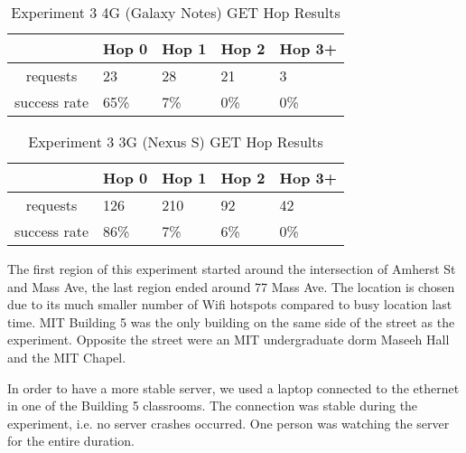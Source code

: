 
\begin{table}[htb]
\begin{scriptsize} 
\caption{Experiment 3 4G (Galaxy Notes) GET Hop Results} 
\label{table:exp-3-4g-hop-results}
 \begin{center}
 \begin{tabular}{| c | p{1.5cm} | p{1.5cm} | p{1.5cm} | p{1.4cm} |}
  \hline
   & Hop 0 & Hop 1 & Hop 2 & Hop 3+ \\
  \hline
  requests & 23 & 28 & 21 & 3\\
  \hline
  success rate & 65\% & 7\% & 0\% & 0\% \\
  \hline
  \end{tabular}
  \end{center}
\end{scriptsize}
\end{table}

\begin{table}[htb]
\begin{scriptsize} 
\caption{Experiment 3 3G (Nexus S) GET Hop Results} 
\label{table:exp-3-3g-hop-results}
 \begin{center}
 \begin{tabular}{| c | p{1.5cm} | p{1.5cm} | p{1.5cm} | p{1.4cm} |}
  \hline
   & Hop 0 & Hop 1 & Hop 2 & Hop 3+ \\
  \hline
  requests & 126 & 210 & 92 & 42\\
  \hline
  success rate & 86\% & 7\% & 6\% & 0\% \\
  \hline
  \end{tabular}
  \end{center}
\end{scriptsize}
\end{table}

The first region of this experiment started around the intersection of Amherst St and Mass Ave, the last region ended around 77 Mass Ave. The location is chosen due to its much smaller number of Wifi hotspots compared to busy location last time. MIT Building 5 was the only building on the same side of the street as the experiment. Opposite the street were an MIT undergraduate dorm Maseeh Hall and the MIT Chapel.

In order to have a more stable server, we used a laptop connected to the ethernet in one of the Building 5 classrooms. The connection was stable during the experiment, i.e. no server crashes occurred. One person was watching the server for the entire duration. 

